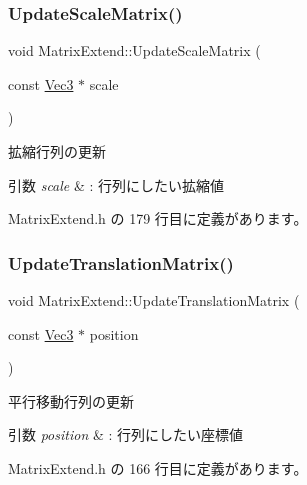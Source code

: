 \subsubsection{\texorpdfstring{Update\+Scale\+Matrix()}{UpdateScaleMatrix()}}
{\footnotesize\ttfamily void Matrix\+Extend\+::\+Update\+Scale\+Matrix (\begin{DoxyParamCaption}\item[{const \mbox{\hyperlink{_vector3_d_8h_ab16f59e4393f29a01ec8b9bbbabbe65d}{Vec3}} $\ast$}]{scale }\end{DoxyParamCaption})\hspace{0.3cm}{\ttfamily [inline]}}



拡縮行列の更新 


\begin{DoxyParams}{引数}
{\em scale} & \+: 行列にしたい拡縮値 \\
\hline
\end{DoxyParams}


 Matrix\+Extend.\+h の 179 行目に定義があります。

\mbox{\label{class_matrix_extend_a6ca471ad3fea88a84fde7623c84f52f6}} 
\subsubsection{\texorpdfstring{Update\+Translation\+Matrix()}{UpdateTranslationMatrix()}}
{\footnotesize\ttfamily void Matrix\+Extend\+::\+Update\+Translation\+Matrix (\begin{DoxyParamCaption}\item[{const \mbox{\hyperlink{_vector3_d_8h_ab16f59e4393f29a01ec8b9bbbabbe65d}{Vec3}} $\ast$}]{position }\end{DoxyParamCaption})\hspace{0.3cm}{\ttfamily [inline]}}



平行移動行列の更新 


\begin{DoxyParams}{引数}
{\em position} & \+: 行列にしたい座標値 \\
\hline
\end{DoxyParams}


 Matrix\+Extend.\+h の 166 行目に定義があります。

